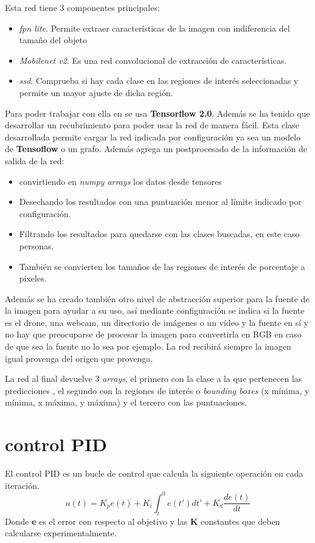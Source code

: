 Esta red tiene 3 componentes principales: 
\begin{itemize}
  \item \textit{\gls{fpn} lite}\cite{fpn}. Permite extraer características de la imagen con indiferencia del tamaño del objeto 
  \item \textit{Mobilenet v2}\cite{mobilenetv2}. Es una red convolucional de extracción de características.
  \item \textit{\gls{ssd}\cite{ssd}}. Comprueba si hay cada clase en las regiones de interés seleccionadas y permite un mayor ajuste de dicha región.
\end{itemize}

Para poder trabajar con ella en se usa \textbf{Tensorflow 2.0}. Además se ha tenido que desarrollar un recubrimiento para poder usar la red de manera fácil.
Esta clase desarrollada permite cargar la red indicada por configuración ya sea un modelo de \textbf{Tensoflow} o un grafo. Además agrega un postprocesado de la información de salida de la red: 

\begin{itemize}
  \item convirtiendo en \textit{numpy arrays} los datos desde tensores
  \item Desechando los resultados con una puntuación menor al límite indicado por configuración.
  \item Filtrando los resultados para quedarse con las clases buscadas, en este caso personas.
  \item También se convierten los tamaños de las regiones de interés de porcentaje a píxeles.
\end{itemize}

Además se ha creado también otro nivel de abstracción superior para la fuente de la imagen para ayudar a su uso, así mediante configuración se indica si la fuente es el drone, una webcam, un directorio de imágenes o un vídeo y la fuente en sí y no hay que preocuparse de procesar la imagen para convertirla en RGB en caso de que sea la fuente no lo sea por ejemplo. La red recibirá siempre la imagen igual provenga del origen que provenga.

La red al final devuelve 3 \textit{arrays}, el primero con la clase a la que pertenecen las predicciones , el segundo con la regiones de interés o \textit{bounding boxes} (x mínima, y mínima, x máxima, y máxima) y el tercero con las puntuaciones.

\section{control PID}
El control PID es un bucle de control que calcula la siguiente operación en cada iteración.
\[ u(t) = K_p e(t) + K_i \int_{t}^{0} e(t') dt' + K_d \frac{de(t)}{dt}\]
Donde \textbf{e} es el error con respecto al objetivo y las \textbf{K} constantes que deben calcularse experimentalmente.

